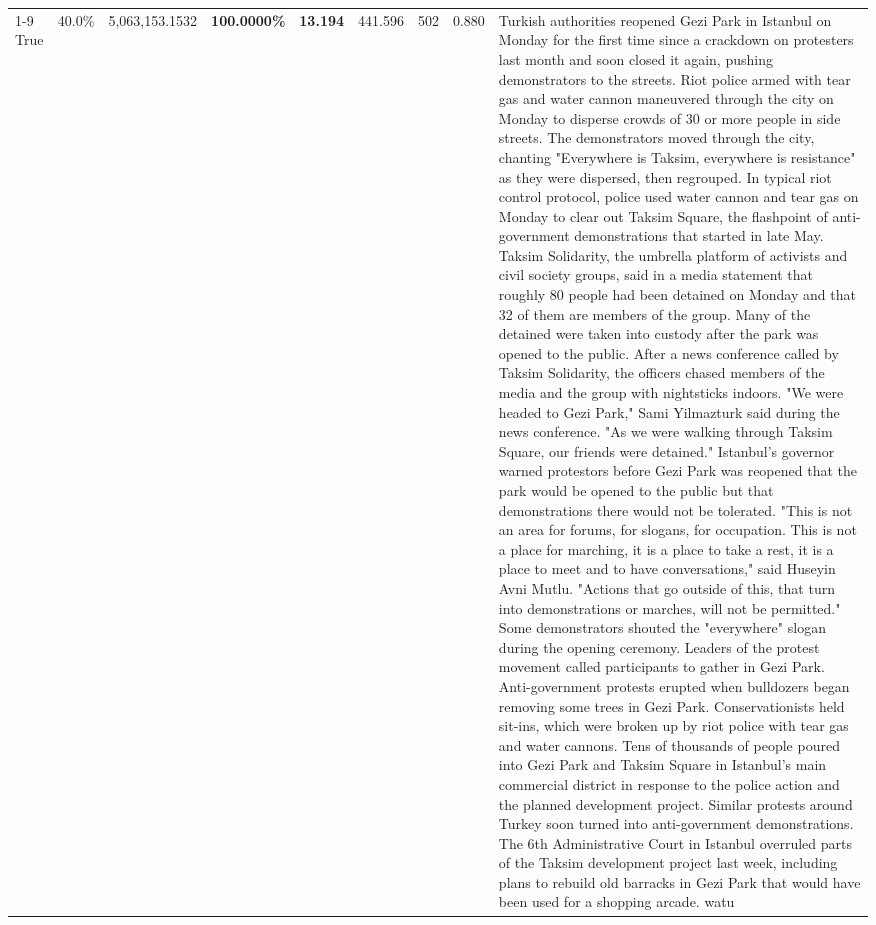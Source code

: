 \begin{table}[H]
\begin{tabular}{lllrlllll}
\cline{1-9}
True & 40.0\% & 5,063,153.1532 & \bfseries \color{red} 100.0000\% & \bfseries \color{red} 13.194 & 441.596 & 502 & 0.880 & Turkish authorities reopened Gezi Park in Istanbul on Monday for the first time since a crackdown on protesters last month and soon closed it again, pushing demonstrators to the streets. Riot police armed with tear gas and water cannon maneuvered through the city on Monday to disperse crowds of 30 or more people in side streets. The demonstrators moved through the city, chanting "Everywhere is Taksim, everywhere is resistance" as they were dispersed, then regrouped. In typical riot control protocol, police used water cannon and tear gas on Monday to clear out Taksim Square, the flashpoint of anti-government demonstrations that started in late May. Taksim Solidarity, the umbrella platform of activists and civil society groups, said in a media statement that roughly 80 people had been detained on Monday and that 32 of them are members of the group. Many of the detained were taken into custody after the park was opened to the public. After a news conference called by Taksim Solidarity, the officers chased members of the media and the group with nightsticks indoors. "We were headed to Gezi Park," Sami Yilmazturk said during the news conference. "As we were walking through Taksim Square, our friends were detained." Istanbul's governor warned protestors before Gezi Park was reopened that the park would be opened to the public but that demonstrations there would not be tolerated. "This is not an area for forums, for slogans, for occupation. This is not a place for marching, it is a place to take a rest, it is a place to meet and to have conversations," said Huseyin Avni Mutlu. "Actions that go outside of this, that turn into demonstrations or marches, will not be permitted." Some demonstrators shouted the "everywhere" slogan during the opening ceremony. Leaders of the protest movement called participants to gather in Gezi Park. Anti-government protests erupted when bulldozers began removing some trees in Gezi Park. Conservationists held sit-ins, which were broken up by riot police with tear gas and water cannons. Tens of thousands of people poured into Gezi Park and Taksim Square in Istanbul's main commercial district in response to the police action and the planned development project. Similar protests around Turkey soon turned into anti-government demonstrations. The 6th Administrative Court in Istanbul overruled parts of the Taksim development project last week, including plans to rebuild old barracks in Gezi Park that would have been used for a shopping arcade. watu \\

\end{tabular}
\end{table}
